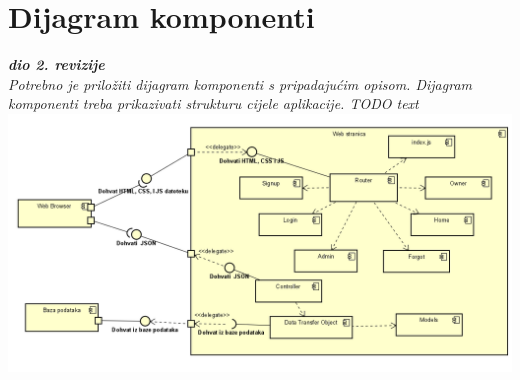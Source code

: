 			 
			\eject
		\section{Dijagram komponenti}
		
			\textbf{\textit{dio 2. revizije}}\\
		
			 \textit{Potrebno je priložiti dijagram komponenti s pripadajućim opisom. Dijagram komponenti treba prikazivati strukturu cijele aplikacije. TODO text}
			 \centering
			 \includegraphics[width=16cm]{slike/dijagram komponenti.png}